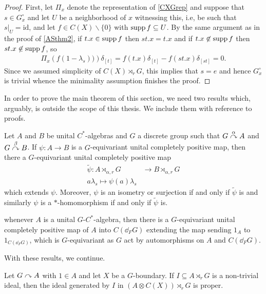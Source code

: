 \begin{proof}
	First, let $\Pi_x$ denote the representation of \cref{CXGrep} and suppose that $s \in G_x^\circ$ and let $U$ be a neighborhood of $x$ witnessing this, i.e, be such that $s|_U = \mathrm{id}$, and let $f \in C(X)\backslash\{0\}$ with $\operatorname{supp} f \subseteq U$. By the same argument as in the proof of \cref{ASthm2}, if $t.x \in \operatorname{supp} f$ then $st.x=t.x$ and if $t.x \not \in \operatorname{supp} f$ then $st.x \not \in \operatorname{supp} f$, so
	\begin{align*}
		\Pi_x\left(f ( 1-\lambda_s)) \right) \delta_{[t]} = f(t.x) \delta_{[t]} -f(st.x) \delta_{[st]}  = 0.
	\end{align*}
	Since we assumed simplicity of $C(X) \rtimes_r G$, this implies that $s = e$ and hence $G_x^\circ $ is trivial whence the minimality assumption finishes the proof.
\end{proof}
	In order to prove the main theorem of this section, we need two results which, arguably, is outside the scope of this thesis. We include them with reference to proofs.
\begin{lemma}
	Let $A$ and $B$ be unital $C^*$-algebras and $G$ a discrete group such that $G \stackrel{\alpha}{\curvearrowright} A$ and $G \stackrel{\beta}{\curvearrowright} B$. If $\psi \colon A \to B$ is a $G$-equivariant unital completely positive map, then there a $G$-equivariant unital completely positive map 
	\begin{align*}
		\tilde \psi \colon A \rtimes_{\alpha,r}  G &\to B \rtimes_{\alpha,r} G\\
		a \lambda_s \mapsto \psi(a) \lambda_s 
	\end{align*}
	which extends $\psi$. Moreover, $\psi$ is an isometry or surjection if and only if $\tilde \psi$ is and similarly $\psi$ is a $*$-homomorphism if and only if $\tilde \psi$ is.
	\label{hamanalift}
\end{lemma}
\begin{lemma}
	whenever $A$ is a unital $G$-$C^*$-algebra, then there is a $G$-equivariant unital completely positive map of $A$ into $C(\dd_F G)$ extending the map sending $1_A$ to $1_{C(\dd_F G)}$, which is $G$-equivariant as $G$ act by automorphisms on $A$ and $C(\dd_F G)$. 
	\label{1lifthamana}
\end{lemma}
With these results, we continue.
\begin{proposition}
	Let $G \stackrel{}{\curvearrowright} A$ with $1 \in A$ and let $X$ be a $G$-boundary. If $I\subseteq A \rtimes_r G$ is a non-trivial ideal, then the ideal generated by $I$ in $(A \otimes C(X))\rtimes_r G$ is proper.
	\label{ozawprop17}
\end{proposition}
